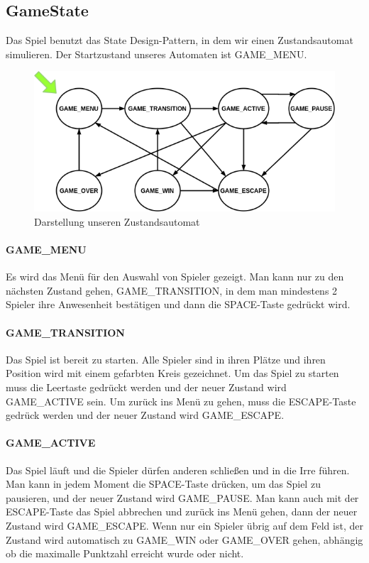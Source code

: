 \documentclass[doktyp=studarbeit]{TUBAFarbeiten}
\begin{document}
\subsection{GameState}

Das Spiel benutzt das State Design-Pattern, in dem wir einen Zustandsautomat
simulieren. Der Startzustand unseres Automaten ist GAME\_MENU. 

\begin{figure}
    \centering
    \includegraphics[width=0.7\linewidth]{state_machine.png}
	\caption{Darstellung unseren Zustandsautomat}
	\label{fig:state-machine}
\end{figure}

\paragraph{GAME\_MENU}
Es wird das Menü für den Auswahl von Spieler gezeigt. Man kann nur zu den
nächsten Zustand gehen, GAME\_TRANSITION, in dem man mindestens 2 Spieler
ihre Anwesenheit bestätigen und dann die SPACE-Taste gedrückt wird.
\paragraph{GAME\_TRANSITION}
Das Spiel ist bereit zu starten. Alle Spieler sind in ihren Plätze und ihren
Position wird mit einem gefarbten Kreis gezeichnet. Um das Spiel zu starten
muss die Leertaste gedrückt werden und der neuer Zustand wird GAME\_ACTIVE sein.
Um zurück ins Menü zu gehen, muss die ESCAPE-Taste gedrück werden und der neuer
Zustand wird GAME\_ESCAPE.
\paragraph{GAME\_ACTIVE}
Das Spiel läuft und die Spieler dürfen anderen schließen und in die Irre führen.
Man kann in jedem Moment die SPACE-Taste drücken, um das Spiel zu pausieren,
und der neuer Zustand wird GAME\_PAUSE. Man kann auch mit der ESCAPE-Taste das
Spiel abbrechen und zurück ins Menü gehen, dann der neuer Zustand wird 
GAME\_ESCAPE. Wenn nur ein Spieler übrig auf dem Feld ist, der Zustand wird 
automatisch zu GAME\_WIN oder GAME\_OVER gehen, abhängig ob die maximalle 
Punktzahl erreicht wurde oder nicht.
\end{document}
